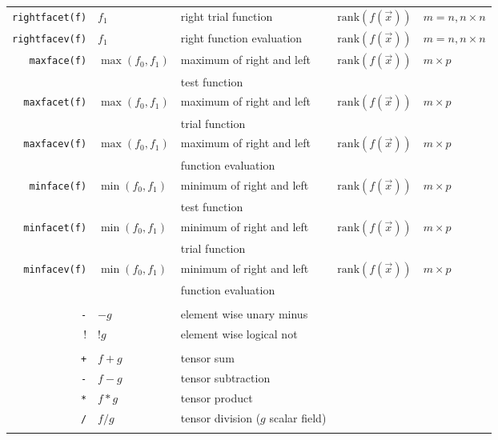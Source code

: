 \begin{longtable}[c]{rllll}
  \lstinline!rightfacet(f)! & $f_1$ & right  trial function & $\mathrm{rank}( f(\overrightarrow{x}))$   & $m=n, n\times n$\\
  \lstinline!rightfacev(f)! & $f_1$ & right   function evaluation & $\mathrm{rank}( f(\overrightarrow{x}))$   & $m=n, n\times n$\\

  \lstinline!maxface(f)! & $\max(f_0,f_1)$ & maximum of right and left & $\mathrm{rank}( f(\overrightarrow{x}))$   & $m\times p$\\
  && test   function&&\\
  \lstinline!maxfacet(f)! & $\max(f_0,f_1)$ & maximum of right and left & $\mathrm{rank}( f(\overrightarrow{x}))$   & $m\times p$\\
  && trial   function&&\\
  \lstinline!maxfacev(f)! & $\max(f_0,f_1)$ & maximum of right and left & $\mathrm{rank}( f(\overrightarrow{x}))$   & $m\times p$\\
  && function evaluation&&\\
  \lstinline!minface(f)! & $\min(f_0,f_1)$ & minimum of right and left & $\mathrm{rank}( f(\overrightarrow{x}))$   & $m\times p$\\
  && test   function&&\\
  \lstinline!minfacet(f)! & $\min(f_0,f_1)$ & minimum of right and left & $\mathrm{rank}( f(\overrightarrow{x}))$   & $m\times p$\\
  && trial   function&&\\
  \lstinline!minfacev(f)! & $\min(f_0,f_1)$ & minimum of right and left & $\mathrm{rank}( f(\overrightarrow{x}))$   & $m\times p$\\
  && function evaluation&&\\
  \hline\\
  \lstinline!-! & $-g$ & element wise unary minus  & & \\
  \lstinline!!! & $!g$ & element wise logical not  & & \\\hline\\

  \lstinline!+! & $f+g$ & tensor sum  & & \\
  \lstinline!-! & $f-g$ & tensor subtraction  & & \\
  \lstinline!*! & $f*g$ & tensor product  & & \\
  \lstinline!/! & $f/g$ & tensor division ($g$ scalar field)  & & \\\hline\\


\end{longtable}
